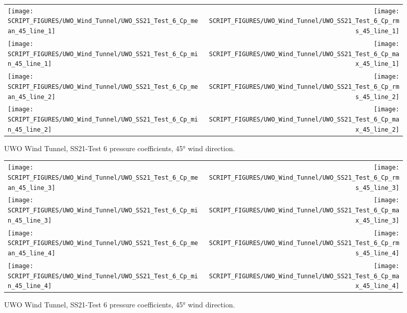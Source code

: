 \begin{figure}[p]
\begin{tabular*}{\textwidth}{l@{\extracolsep{\fill}}r}
\texttt{[image: SCRIPT\_FIGURES/UWO\_Wind\_Tunnel/UWO\_SS21\_Test\_6\_Cp\_mean\_45\_line\_1]} &
\texttt{[image: SCRIPT\_FIGURES/UWO\_Wind\_Tunnel/UWO\_SS21\_Test\_6\_Cp\_rms\_45\_line\_1]} \\
\texttt{[image: SCRIPT\_FIGURES/UWO\_Wind\_Tunnel/UWO\_SS21\_Test\_6\_Cp\_min\_45\_line\_1]} &
\texttt{[image: SCRIPT\_FIGURES/UWO\_Wind\_Tunnel/UWO\_SS21\_Test\_6\_Cp\_max\_45\_line\_1]} \\
\texttt{[image: SCRIPT\_FIGURES/UWO\_Wind\_Tunnel/UWO\_SS21\_Test\_6\_Cp\_mean\_45\_line\_2]} &
\texttt{[image: SCRIPT\_FIGURES/UWO\_Wind\_Tunnel/UWO\_SS21\_Test\_6\_Cp\_rms\_45\_line\_2]} \\
\texttt{[image: SCRIPT\_FIGURES/UWO\_Wind\_Tunnel/UWO\_SS21\_Test\_6\_Cp\_min\_45\_line\_2]} &
\texttt{[image: SCRIPT\_FIGURES/UWO\_Wind\_Tunnel/UWO\_SS21\_Test\_6\_Cp\_max\_45\_line\_2]}
\end{tabular*}
\caption[UWO Wind Tunnel, SS21-Test 6 pressure coefficients, 45\si{\degree}]{UWO Wind Tunnel, SS21-Test 6 pressure coefficients, 45\si{\degree} wind direction.}
\label{UWO_SS21_Test_6_pressure_coefficients_45_3}
\end{figure}

\begin{figure}[p]
\begin{tabular*}{\textwidth}{l@{\extracolsep{\fill}}r}
\texttt{[image: SCRIPT\_FIGURES/UWO\_Wind\_Tunnel/UWO\_SS21\_Test\_6\_Cp\_mean\_45\_line\_3]} &
\texttt{[image: SCRIPT\_FIGURES/UWO\_Wind\_Tunnel/UWO\_SS21\_Test\_6\_Cp\_rms\_45\_line\_3]} \\
\texttt{[image: SCRIPT\_FIGURES/UWO\_Wind\_Tunnel/UWO\_SS21\_Test\_6\_Cp\_min\_45\_line\_3]} &
\texttt{[image: SCRIPT\_FIGURES/UWO\_Wind\_Tunnel/UWO\_SS21\_Test\_6\_Cp\_max\_45\_line\_3]} \\
\texttt{[image: SCRIPT\_FIGURES/UWO\_Wind\_Tunnel/UWO\_SS21\_Test\_6\_Cp\_mean\_45\_line\_4]} &
\texttt{[image: SCRIPT\_FIGURES/UWO\_Wind\_Tunnel/UWO\_SS21\_Test\_6\_Cp\_rms\_45\_line\_4]} \\
\texttt{[image: SCRIPT\_FIGURES/UWO\_Wind\_Tunnel/UWO\_SS21\_Test\_6\_Cp\_min\_45\_line\_4]} &
\texttt{[image: SCRIPT\_FIGURES/UWO\_Wind\_Tunnel/UWO\_SS21\_Test\_6\_Cp\_max\_45\_line\_4]}
\end{tabular*}
\caption[UWO Wind Tunnel, SS21-Test 6 pressure coefficients, 45\si{\degree}]{UWO Wind Tunnel, SS21-Test 6 pressure coefficients, 45\si{\degree} wind direction.}
\label{UWO_SS21_Test_6_pressure_coefficients_45_4}
\end{figure}







